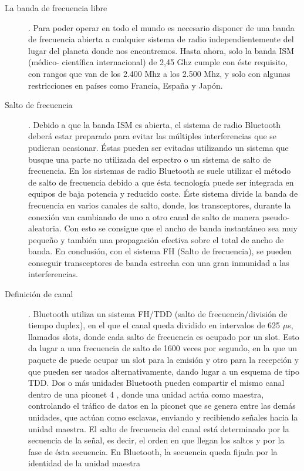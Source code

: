\begin{description}
\item[La banda de frecuencia libre].
Para poder operar en todo el mundo es necesario disponer de una banda de
frecuencia abierta a cualquier sistema de radio independientemente del lugar 
del planeta donde nos encontremos. Hasta ahora, solo la banda ISM (médico-
científica internacional) de 2,45 Ghz cumple con éste requisito, con rangos 
que van de los 2.400 Mhz a los 2.500 Mhz, y solo con algunas restricciones 
en países como Francia, España y Japón.
\item[Salto de frecuencia].
Debido a que la banda ISM es abierta, el sistema de radio Bluetooth deberá 
estar preparado para evitar las múltiples interferencias que se pudieran 
ocasionar. Éstas pueden ser evitadas utilizando un sistema que busque una 
parte no utilizada del espectro o un sistema de salto de frecuencia. En los 
sistemas de radio Bluetooth se suele utilizar el método de salto de 
frecuencia debido a que ésta tecnología puede ser integrada en equipos
de baja potencia y reducido coste. Éste sistema divide la banda de 
frecuencia en varios canales de salto, donde, los transceptores, durante la 
conexión van cambiando de uno a otro canal de salto de manera pseudo-
aleatoria. Con esto se consigue que el ancho de banda instantáneo sea muy 
pequeño y también una propagación efectiva sobre el total de ancho de banda. 
En conclusión, con el sistema FH (Salto de frecuencia), se pueden conseguir 
transceptores de banda estrecha con una gran inmunidad a las interferencias.
\item[Definición de canal].
Bluetooth utiliza un sistema FH/TDD (salto de frecuencia/división de tiempo
duplex), en el que el canal queda dividido en intervalos de 625 $\mu$s, 
llamados slots, donde cada salto de frecuencia es ocupado por un slot. Esto da 
lugar a una frecuencia de salto de 1600 veces por segundo, en la que un 
paquete de puede ocupar un slot para la emisión y otro para la recepción y que 
pueden ser usados alternativamente, dando lugar a un esquema de tipo TDD.
Dos o más unidades Bluetooth pueden compartir el mismo canal dentro de una
piconet 4 , donde una unidad actúa como maestra, controlando el tráfico de 
datos en la piconet que se genera entre las demás unidades, que actúan como 
esclavas, enviando y recibiendo señales hacia la unidad maestra. El salto de 
frecuencia del canal está determinado por la secuencia de la señal, es 
decir, el orden en que llegan los saltos y por la fase de ésta secuencia. En 
Bluetooth, la secuencia queda fijada por la identidad de la unidad maestra 

\end{description}
